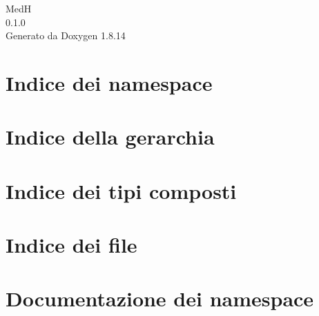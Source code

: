\documentclass[twoside]{book}
\newcommand{\+}{\discretionary{\mbox{\scriptsize$\hookleftarrow$}}{}{}}
\newcommand{\clearemptydoublepage}{%
  \newpage{\pagestyle{empty}\cleardoublepage}%
}
\begin{document}
\hypersetup{pageanchor=false,
             bookmarksnumbered=true,
             pdfencoding=unicode
            }
\begin{titlepage}
\vspace*{7cm}
\begin{center}%
{\Large MedH \\[1ex]\large 0.\+1.\+0 }\\
\vspace*{1cm}
{\large Generato da Doxygen 1.8.14}\\
\end{center}
\end{titlepage}
\clearemptydoublepage
{}
\tableofcontents
\clearemptydoublepage
{}
\hypersetup{pageanchor=true}

\chapter{Indice dei namespace}

\chapter{Indice della gerarchia}

\chapter{Indice dei tipi composti}

\chapter{Indice dei file}

\chapter{Documentazione dei namespace}






\end{document}

